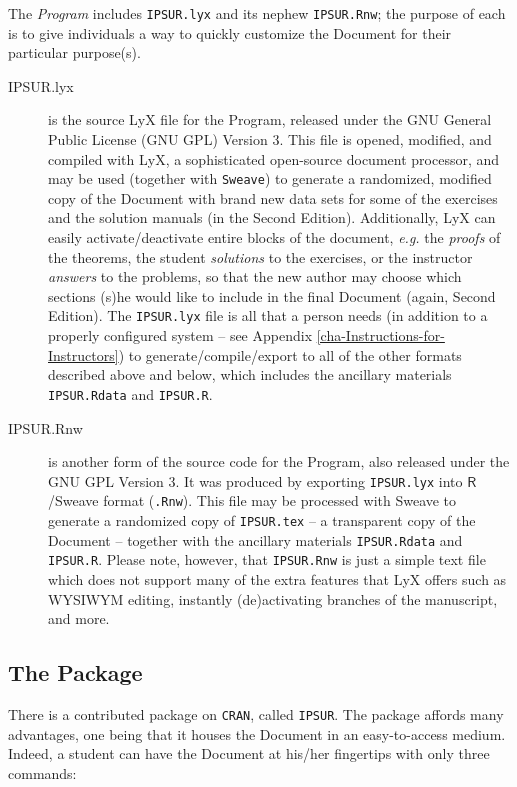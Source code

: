 The \emph{Program} includes \texttt{IPSUR.lyx} and its nephew \texttt{IPSUR.Rnw}; the purpose of each is to give individuals a way to quickly customize the Document for their particular purpose(s).
\begin{description}
\item[IPSUR.lyx] is the source LyX file for the Program, released under the GNU General Public License (GNU GPL) Version 3. This file is opened, modified, and compiled with LyX, a sophisticated open-source document processor, and may be used (together with \texttt{Sweave}) to generate a randomized, modified copy of the Document with brand new data sets for some of the exercises and the solution manuals (in the Second Edition). Additionally, LyX can easily activate/deactivate entire blocks of the document, \emph{e.g.} the \emph{proofs} of the theorems, the student \emph{solutions} to the exercises, or the instructor \emph{answers} to the problems, so that the new author may choose which sections (s)he would like to include in the final Document (again, Second Edition). The \texttt{IPSUR.lyx} file is all that a person needs (in addition to a properly configured system -- see Appendix \ref{cha-Instructions-for-Instructors}) to generate/compile/export to all of the other formats described above and below, which includes the ancillary materials \texttt{IPSUR.Rdata} and \texttt{IPSUR.R}.
\item[IPSUR.Rnw] is another form of the source code for the Program, also released under the GNU GPL Version 3. It was produced by exporting \texttt{IPSUR.lyx} into \(\mathsf{R}\)/Sweave format (\texttt{.Rnw}). This file may be processed with Sweave to generate a randomized copy of \texttt{IPSUR.tex} -- a transparent copy of the Document -- together with the ancillary materials \texttt{IPSUR.Rdata} and \texttt{IPSUR.R}. Please note, however, that \texttt{IPSUR.Rnw} is just a simple text file which does not support many of the extra features that LyX offers such as WYSIWYM editing, instantly (de)activating branches of the manuscript, and more.
\end{description}

\subsection*{The Package}

There is a contributed package on \texttt{CRAN}, called \texttt{IPSUR}. The package affords many advantages, one being that it houses the  Document in an easy-to-access medium. Indeed, a student can have the Document at his/her fingertips with only three commands:



